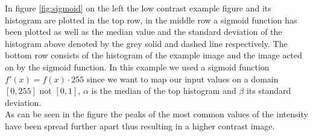 In figure \ref{fig:sigmoid} on the left the low contrast example figure and its histogram are plotted in the top row, in the middle row a sigmoid function has been plotted as well as the median value and the standard deviation of the histogram above denoted by the grey solid and dashed line respectively. The bottom row consists of the histogram of the example image and the image acted on by the sigmoid function. In this example we used a sigmoid function $f'(x)=f(x) \cdot 255$ since we want to map our input values on a domain $[0,255]$ not $[0,1]$, $\alpha$ is the median of the top histogram and $\beta$ its standard deviation.\\
As can be seen in the figure the peaks of the most common values of the intensity have been spread further apart thus resulting in a higher contrast image.\\

\clearpage

